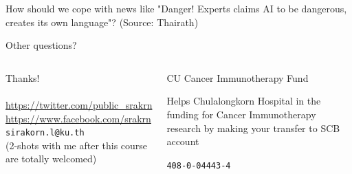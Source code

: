 \documentclass[aspectratio=169]{beamer}
\begin{document}
\begin{frame}
	\begin{center}
		{\Large How should we cope with news like "Danger! Experts claims AI to be dangerous, creates its own language"?}
		{\small (Source: Thairath)}
	\end{center}
\end{frame}

\begin{frame}
	\begin{center}
		{\huge Other questions?}
	\end{center}
\end{frame}

\begin{frame}
	\begin{columns}
		\begin{center}
			{\Huge Thanks!}
			\\~\\
			\url{https://twitter.com/public_srakrn}\\
			\url{https://www.facebook.com/srakrn}\\
			\texttt{sirakorn.l@ku.th}\\
			{\tiny (2-shots with me after this course are totally welcomed)}
		\end{center}
		\begin{block}{CU Cancer Immunotherapy Fund}
			{\small
				Helps Chulalongkorn Hospital in the funding for Cancer Immunotherapy research by making your transfer to SCB account\\
				\begin{center}
					\large{\texttt{408-0-04443-4}}
				\end{center}
			}
		\end{block}
	\end{columns}
\end{frame}
\end{document}
